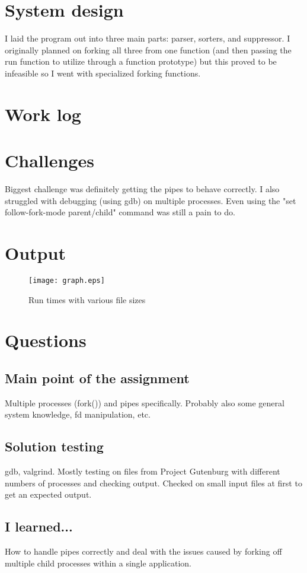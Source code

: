 \documentclass[letterpaper,10pt,titlepage]{article}
\begin{document}
\section{System design}
I laid the program out into three main parts: parser, sorters, and suppressor.
I originally planned on forking all three from one function (and then passing the
run function to utilize through a function prototype) but this proved to be
infeasible so I went with specialized forking functions.

\section{Work log}


\section{Challenges}
Biggest challenge was definitely getting the pipes to behave correctly. I also
struggled with debugging (using gdb) on multiple processes. Even using the
"set follow-fork-mode parent/child" command was still a pain to do.

\section{Output}
\begin{figure}[h!]
	\centering
	\caption{Run times with various file sizes}
	\texttt{[image: graph.eps]}
\end{figure}

\section{Questions}
\subsection{Main point of the assignment}
Multiple processes (fork()) and pipes specifically. Probably also some general
system knowledge, fd manipulation, etc.

\subsection{Solution testing}
gdb, valgrind. Mostly testing on files from Project Gutenburg with different numbers
of processes and checking output. Checked on small input files at first to get an
expected output.

\subsection{I learned...}
How to handle pipes correctly and deal with the issues caused by forking off multiple
child processes within a single application.
\end{document}

